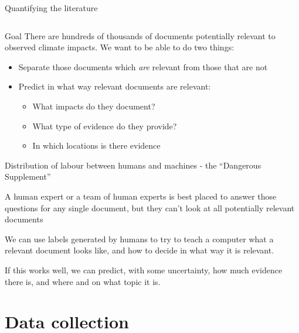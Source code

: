 \documentclass[9pt]{beamer}
\begin{document}
\begin{frame}{Quantifying the literature}
\begin{columns}
\end{columns}

\end{frame}


\begin{frame}{Goal}
There are hundreds of thousands of documents potentially relevant to observed climate impacts. We want to be able to do two things:

\begin{itemize}
	\item<2-> Separate those documents which \textit{are} relevant from those that are not
	\item<3-> Predict in what way relevant documents are relevant:
	\begin{itemize}
		\item What impacts do they document?
		\item What type of evidence do they provide?
		\item In which locations is there evidence
	\end{itemize}
\end{itemize}


\end{frame}



\begin{frame}{Distribution of labour between humans and machines - the ``Dangerous Supplement''}

A human expert or a team of human experts is best placed to answer those questions for any single document, but they can't look at all potentially relevant documents

\bigskip

We can use labels generated by humans to try to teach a computer what a relevant document looks like, and how to decide in what way it is relevant. 

\bigskip

If this works well, we can predict, with some uncertainty, how much evidence there is, and where and on what topic it is.

\end{frame}


\section{Data collection}
\end{document}
